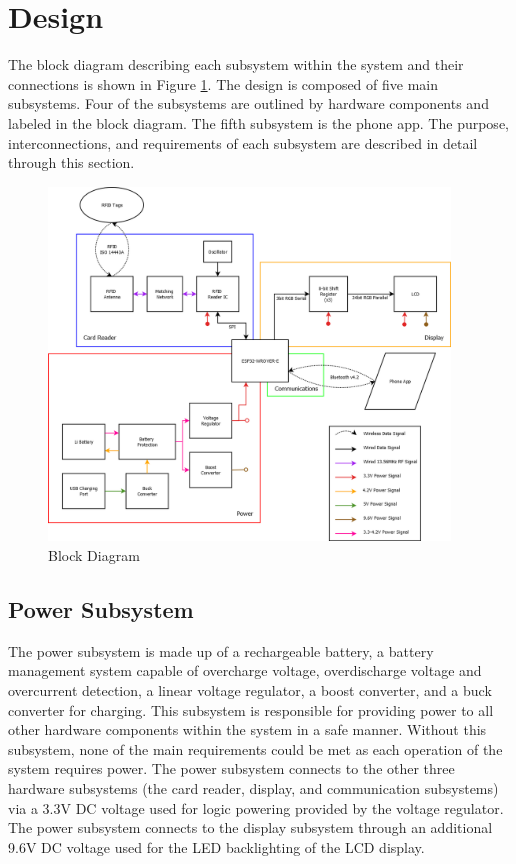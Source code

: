 \documentclass[12pt]{article}
\begin{document}
\section{Design}

The block diagram describing each subsystem within the system and their connections is shown in Figure \ref{fig:block}. The design is composed of five main subsystems. Four of the subsystems are outlined by hardware components and labeled in the block diagram. The fifth subsystem is the phone app. The purpose, interconnections, and requirements of each subsystem are described in detail through this section.

\begin{figure}[!h]
	\centering
	\includegraphics[width=0.95\textwidth]{Full_Block_Diagram_v6.png}
	\caption{Block Diagram}
	\label{fig:block}
\end{figure}

\subsection{Power Subsystem}

The power subsystem is made up of a rechargeable battery, a battery management system capable of overcharge voltage, overdischarge voltage and overcurrent detection, a linear voltage regulator, a boost converter, and a buck converter for charging. This subsystem is responsible for providing power to all other hardware components within the system in a safe manner. Without this subsystem, none of the main requirements could be met as each operation of the system requires power. The power subsystem connects to the other three hardware subsystems (the card reader, display, and communication subsystems) via a 3.3V DC voltage used for logic powering provided by the voltage regulator. The power subsystem connects to the display subsystem through an additional 9.6V DC voltage used for the LED backlighting of the LCD display.
\end{document}
